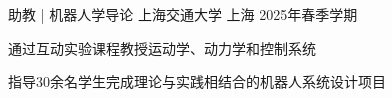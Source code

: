 \vspace{-2mm}

\begin{cventries}
    \cventry
    {助教 | 机器人学导论} %
    {上海交通大学} %
    {上海} %
    {2025年春季学期} %
    {
        \vspace{-5mm}
        \begin{cvitems}
            \item{通过互动实验课程教授运动学、动力学和控制系统}
            \item{指导30余名学生完成理论与实践相结合的机器人系统设计项目}
        \vspace{2.5mm}
        \end{cvitems}
    }%
\end{cventries}
